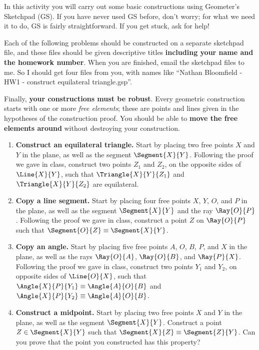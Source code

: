 \documentclass{article}
\begin{document}
\HomeworkTitle[class={College Geometry}, number={1}, name={Basic Constructions}]

\noindent In this activity you will carry out some basic constructions using Geometer's Sketchpad (GS). If you have never used GS before, don't worry; for what we need it to do, GS is fairly straightforward. If you get stuck, ask for help!

Each of the following problems should be constructed on a separate sketchpad file, and these files should be given descriptive titles \textbf{including your name and the homework number}. When you are finished, email the sketchpad files to me. So I should get four files from you, with names like ``Nathan Bloomfield - HW1 - construct equilateral triangle.gsp''.

Finally, \textbf{your constructions must be robust}. Every geometric construction starts with one or more \emph{free elements}; these are points and lines given in the hypotheses of the construction proof. You should be able to \textbf{move the free elements around} without destroying your construction.

\begin{enumerate}
\item \textbf{Construct an equilateral triangle.} Start by placing two free points $X$ and $Y$ in the plane, as well as the segment $\Segment{X}{Y}$. Following the proof we gave in class, construct two points $Z_1$ and $Z_2$, on the opposite sides of $\Line{X}{Y}$, such that $\Triangle{X}{Y}{Z_1}$ and $\Triangle{X}{Y}{Z_2}$ are equilateral.

\item \textbf{Copy a line segment.} Start by placing four free points $X$, $Y$, $O$, and $P$ in the plane, as well as the segment $\Segment{X}{Y}$ and the ray $\Ray{O}{P}$. Following the proof we gave in class, construct a point $Z$ on $\Ray{O}{P}$ such that $\Segment{O}{Z} \equiv \Segment{X}{Y}$.

\item \textbf{Copy an angle.} Start by placing five free points $A$, $O$, $B$, $P$, and $X$ in the plane, as well as the rays $\Ray{O}{A}$, $\Ray{O}{B}$, and $\Ray{P}{X}$. Following the proof we gave in class, construct two points $Y_1$ and $Y_2$, on opposite sides of $\Line{O}{X}$, such that $\Angle{X}{P}{Y_1} \equiv \Angle{A}{O}{B}$ and $\Angle{X}{P}{Y_2} \equiv \Angle{A}{O}{B}$.

\item \textbf{Construct a midpoint.} Start by placing two free points $X$ and $Y$ in the plane, as well as the segment $\Segment{X}{Y}$. Construct a point $Z \in \Segment{X}{Y}$ such that $\Segment{X}{Z} \equiv \Segment{Z}{Y}$. Can you prove that the point you constructed has this property?
\end{enumerate}
\end{document}
